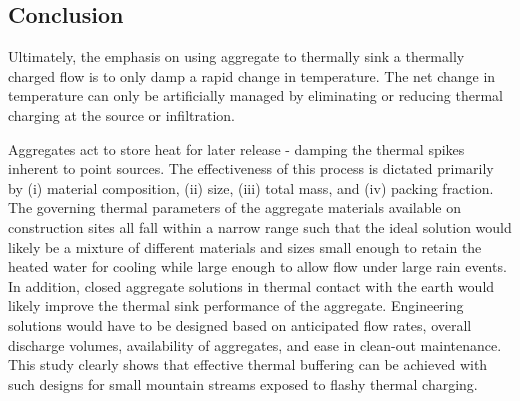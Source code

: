 \subsection{Conclusion}
Ultimately, the emphasis on using aggregate to thermally sink a thermally charged flow is to only damp a rapid change in temperature. The net change in temperature can only be artificially managed by eliminating or reducing thermal charging at the source or infiltration. 

Aggregates act to store heat for later release - damping the thermal spikes inherent to point sources. The effectiveness of this process is dictated primarily by (i) material composition, (ii) size, (iii) total mass, and (iv) packing fraction. The governing thermal parameters of the aggregate materials available on construction sites all fall within a narrow range such that the ideal solution would likely be a mixture of different materials and sizes small enough to retain the heated water for cooling while large enough to allow flow under large rain events. In addition, closed aggregate solutions in thermal contact with the earth would likely improve the thermal sink performance of the aggregate. Engineering solutions would have to be designed based on anticipated flow rates, overall discharge volumes, availability of aggregates, and ease in clean-out maintenance. This study clearly shows that effective thermal buffering can be achieved with such designs for small mountain streams exposed to flashy thermal charging.